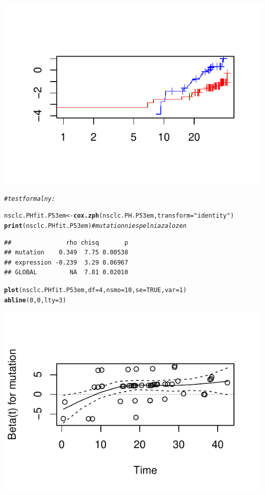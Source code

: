 \documentclass[10pt,a4paper]{article}\usepackage[]{graphicx}\usepackage[]{color}
\makeatletter
\def\maxwidth{ %
  \ifdim\Gin@nat@width>\linewidth
    \linewidth
  \else
    \Gin@nat@width
  \fi
}
\newcommand{\hlnum}[1]{\textcolor[rgb]{0.686,0.059,0.569}{#1}}%
\newcommand{\hlstr}[1]{\textcolor[rgb]{0.192,0.494,0.8}{#1}}%
\newcommand{\hlcom}[1]{\textcolor[rgb]{0.678,0.584,0.686}{\textit{#1}}}%
\newcommand{\hlstd}[1]{\textcolor[rgb]{0.345,0.345,0.345}{#1}}%
\newcommand{\hlkwb}[1]{\textcolor[rgb]{0.69,0.353,0.396}{#1}}%
\newcommand{\hlkwc}[1]{\textcolor[rgb]{0.333,0.667,0.333}{#1}}%
\newcommand{\hlkwd}[1]{\textcolor[rgb]{0.737,0.353,0.396}{\textbf{#1}}}%
\newenvironment{kframe}{%
 \def\at@end@of@kframe{}%
 \ifinner\ifhmode%
  \def\at@end@of@kframe{\end{minipage}}%
  \begin{minipage}{\columnwidth}%
 \fi\fi%
 \def\FrameCommand##1{\hskip\@totalleftmargin \hskip-\fboxsep
 \colorbox{shadecolor}{##1}\hskip-\fboxsep
     \hskip-\linewidth \hskip-\@totalleftmargin \hskip\columnwidth}%
 \MakeFramed {\advance\hsize-\width
   \@totalleftmargin\z@ \linewidth\hsize
   \@setminipage}}%
 {\par\unskip\endMakeFramed%
 \at@end@of@kframe}
\newenvironment{knitrout}{}{} %
\makeatother
\begin{document}
\begin{knitrout}
{\centering \includegraphics[width=\maxwidth]{figure/unnamed-chunk-18} 

}


\begin{kframe}\begin{alltt}
\hlcom{# test formalny:}

\hlstd{nsclc.PHfit.P53em} \hlkwb{<-} \hlkwd{cox.zph}\hlstd{(nsclc.PH.P53em,} \hlkwc{transform} \hlstd{=} \hlstr{"identity"}\hlstd{)}
\hlkwd{print}\hlstd{(nsclc.PHfit.P53em)}  \hlcom{# mutation nie spelnia zalozen}
\end{alltt}
\begin{verbatim}
##               rho chisq       p
## mutation    0.349  7.75 0.00538
## expression -0.239  3.29 0.06967
## GLOBAL         NA  7.81 0.02010
\end{verbatim}
\begin{alltt}
\hlkwd{plot}\hlstd{(nsclc.PHfit.P53em,} \hlkwc{df} \hlstd{=} \hlnum{4}\hlstd{,} \hlkwc{nsmo} \hlstd{=} \hlnum{10}\hlstd{,} \hlkwc{se} \hlstd{=} \hlnum{TRUE}\hlstd{,} \hlkwc{var} \hlstd{=} \hlnum{1}\hlstd{)}
\hlkwd{abline}\hlstd{(}\hlnum{0}\hlstd{,} \hlnum{0}\hlstd{,} \hlkwc{lty} \hlstd{=} \hlnum{3}\hlstd{)}
\end{alltt}
\end{kframe}

{\centering \includegraphics[width=\maxwidth]{figure/unnamed-chunk-19} 

}
\end{knitrout}
\end{document}
